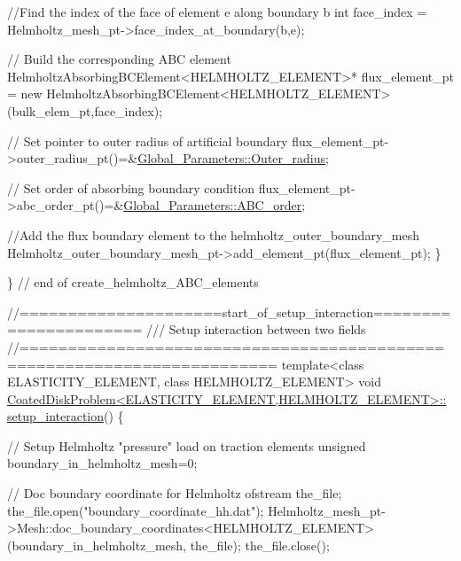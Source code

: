 \begin{DoxyCodeInclude}
{   \textcolor{comment}{//Find the index of the face of element e along boundary b }
   \textcolor{keywordtype}{int} face\_index = Helmholtz\_mesh\_pt->face\_index\_at\_boundary(b,e);
   
   \textcolor{comment}{// Build the corresponding ABC element}
   HelmholtzAbsorbingBCElement<HELMHOLTZ\_ELEMENT>* flux\_element\_pt = \textcolor{keyword}{new} 
    HelmholtzAbsorbingBCElement<HELMHOLTZ\_ELEMENT>(bulk\_elem\_pt,face\_index);

   \textcolor{comment}{// Set pointer to outer radius of artificial boundary}
   flux\_element\_pt->outer\_radius\_pt()=&\hyperlink{namespaceGlobal__Parameters_a88ded445ecd7bd89701409e68fd0b900}{Global\_Parameters::Outer\_radius};
   
   \textcolor{comment}{// Set order of absorbing boundary condition}
   flux\_element\_pt->abc\_order\_pt()=&\hyperlink{namespaceGlobal__Parameters_ae16eb10039cab2098b02ec7dff946277}{Global\_Parameters::ABC\_order};   

   \textcolor{comment}{//Add the flux boundary element to the  helmholtz\_outer\_boundary\_mesh}
   Helmholtz\_outer\_boundary\_mesh\_pt->add\_element\_pt(flux\_element\_pt);
  \}

\} \textcolor{comment}{// end of create\_helmholtz\_ABC\_elements}



\textcolor{comment}{//=====================start\_of\_setup\_interaction======================}\textcolor{comment}{}
\textcolor{comment}{/// Setup interaction between two fields}
\textcolor{comment}{}\textcolor{comment}{//========================================================================}
\textcolor{keyword}{template}<\textcolor{keyword}{class} ELASTICITY\_ELEMENT, \textcolor{keyword}{class} HELMHOLTZ\_ELEMENT>
\textcolor{keywordtype}{void} \hyperlink{classCoatedDiskProblem_ad24d43389155a6a9f2f66faf4b239c26}{CoatedDiskProblem<ELASTICITY\_ELEMENT,HELMHOLTZ\_ELEMENT>::}
\hyperlink{classCoatedDiskProblem_ad24d43389155a6a9f2f66faf4b239c26}{setup\_interaction}()
\{

 \textcolor{comment}{// Setup Helmholtz "pressure" load on traction elements}
 \textcolor{keywordtype}{unsigned} boundary\_in\_helmholtz\_mesh=0;

 \textcolor{comment}{// Doc boundary coordinate for Helmholtz}
 ofstream the\_file;
 the\_file.open(\textcolor{stringliteral}{"boundary\_coordinate\_hh.dat"});
 Helmholtz\_mesh\_pt->Mesh::doc\_boundary\_coordinates<HELMHOLTZ\_ELEMENT>
  (boundary\_in\_helmholtz\_mesh, the\_file);
 the\_file.close();

}
\end{DoxyCodeInclude}
